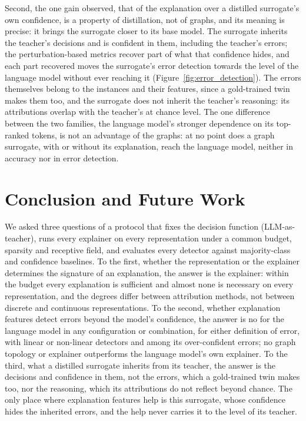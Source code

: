 \documentclass[preprint, times, review, 10pt]{elsarticle}
\begin{document}
Second, the one gain observed, that of the explanation over a distilled surrogate's own confidence, is a property of distillation, not of graphs, and its meaning is precise: it brings the surrogate closer to its base model. The surrogate inherits the teacher's decisions and is confident in them, including the teacher's errors; the perturbation-based metrics recover part of what that confidence hides, and each part recovered moves the surrogate's error detection towards the level of the language model without ever reaching it (Figure~\ref{fig:error_detection}). The errors themselves belong to the instances and their features, since a gold-trained twin makes them too, and the surrogate does not inherit the teacher's reasoning: its attributions overlap with the teacher's at chance level. The one difference between the two families, the language model's stronger dependence on its top-ranked tokens, is not an advantage of the graphs: at no point does a graph surrogate, with or without its explanation, reach the language model, neither in accuracy nor in error detection.


\section{Conclusion and Future Work}

We asked three questions of a protocol that fixes the decision function (LLM-as-teacher), runs every explainer on every representation under a common budget, sparsity and receptive field, and evaluates every detector against majority-class and confidence baselines. To the first, whether the representation or the explainer determines the signature of an explanation, the answer is the explainer: within the budget every explanation is sufficient and almost none is necessary on every representation, and the degrees differ between attribution methods, not between discrete and continuous representations. To the second, whether explanation features detect errors beyond the model's confidence, the answer is no for the language model in any configuration or combination, for either definition of error, with linear or non-linear detectors and among its over-confident errors; no graph topology or explainer outperforms the language model's own explainer. To the third, what a distilled surrogate inherits from its teacher, the answer is the decisions and confidence in them, not the errors, which a gold-trained twin makes too, nor the reasoning, which its attributions do not reflect beyond chance. The only place where explanation features help is this surrogate, whose confidence hides the inherited errors, and the help never carries it to the level of its teacher.
\end{document}
